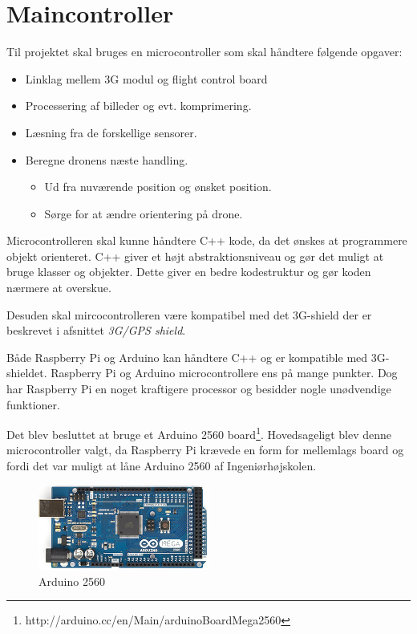 \section{Maincontroller}

Til projektet skal bruges en microcontroller som skal håndtere følgende opgaver:  
\begin{itemize}
	\item Linklag mellem 3G modul og flight control board
	\item Processering af billeder og evt. komprimering.
	\item Læsning fra de forskellige sensorer.
	\item Beregne dronens næste handling. 
	\begin{itemize}
		\item Ud fra nuværende position og ønsket position.
		\item Sørge for at ændre orientering på drone. 
	\end{itemize}
\end{itemize}

\vspace{0.5cm}

Microcontrolleren skal kunne håndtere C++ kode, da det ønskes at programmere objekt orienteret. C++ giver et højt abstraktionsniveau og gør det muligt at bruge klasser og objekter. Dette giver en bedre kodestruktur og gør koden nærmere at overskue.

Desuden skal mircocontrolleren være kompatibel med det 3G-shield der er beskrevet i afsnittet \textit{3G/GPS shield}. 

Både Raspberry Pi og Arduino kan håndtere C++ og er kompatible med 3G-shieldet. Raspberry Pi og Arduino microcontrollere ens på mange punkter. Dog har Raspberry Pi en noget kraftigere processor og besidder nogle unødvendige funktioner. 

Det blev besluttet at bruge et Arduino 2560 board\footnote{http://arduino.cc/en/Main/arduinoBoardMega2560}. Hovedsageligt blev denne microcontroller valgt, da Raspberry Pi krævede en form for mellemlags board og fordi det var muligt at låne Arduino 2560 af Ingeniørhøjskolen. 

\vspace{0.5cm}

\begin{figure}[H]
\centering
\includegraphics[width=0.5\textwidth]{Billeder/ArduinoMega2560.png}
\caption{Arduino 2560}
\label{fig:Arduino_2560}
\end{figure}


